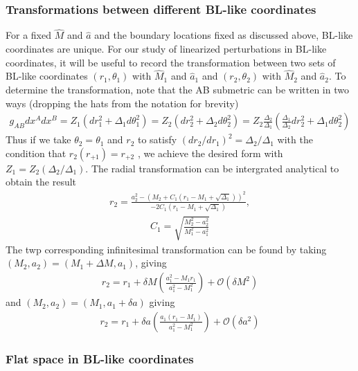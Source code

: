 \documentclass[aps,prd,amsmath,showpacs,amssymb,superscriptaddress,nofootinbib,longbibliography,eqsecnum,preprintnumbers]{revtex4-1}
\begin{document}
\subsubsection{Transformations between different BL-like coordinates}
For a fixed $\hat M$ and $\hat a$ and the boundary locations fixed as discussed above, BL-like coordinates are unique. For our study of linearized perturbations in BL-like coordinates, it will be useful to record the transformation between two sets of BL-like coordinates $(r_1,\theta_1)$  with $\hat M_1$ and $\hat a_1$ and $(r_2,\theta_2)$ with $\hat M_2$ and $\hat a_2$. To determine the transformation, note that the AB submetric can be written in two ways (dropping the hats from the notation for brevity)
\begin{align}
g_{AB}dx^Adx^B=Z_1(dr_1^2+\Delta_1 d\theta_1^2)=Z_2(dr_2^2+\Delta_2 d\theta_2^2)=Z_2\frac{\Delta_2}{\Delta_1}\left(\frac{\Delta_1}{\Delta_2}dr_2^2+\Delta_1 d\theta_2^2\right)
\end{align}
Thus if we take $\theta_2 =\theta_1$ and $r_2$ to satisfy $(dr_2/dr_1)^2=\Delta_2/\Delta_1$ 
with the condition that $r_2(r_{+1})=r_{+2}$
, we achieve the desired form with $Z_1=Z_2(\Delta_2/\Delta_1)$. The radial transformation can be intergrated analytical to obtain the result
\begin{align}
r_2=\frac{a_2^2-(M_2+C_1(r_1-M_1+\sqrt{\Delta_1}))^2}{-2C_1(r_1-M_1+\sqrt{\Delta_1})},
\end{align}
\begin{align}
C_1=\sqrt{\frac{M_2^2-a_2^2}{M_1^2-a_1^2}}
\end{align}
The twp corresponding infinitesimal transformation can be found by taking $(M_2,a_2) =(M_1+\Delta M, a_1)$, giving
\begin{align}
r_2=r_1+\delta M\left(\frac{a_1^2-M_1r_1}{a_1^2-M_1^2}\right) +\mathcal{O}(\delta M^2) \label{eq:infM}
\end{align}
 and $(M_2,a_2)=(M_1,a_1 +\delta a)$ giving
 \begin{align}
 r_2=r_1+\delta a\left(\frac{a_1(r_1-M_1)}{a_1^2-M_1^2}\right) +\mathcal{O}(\delta a^2)  \label{eq:infa}
 \end{align}

\subsubsection{Flat space in BL-like coordinates}
\end{document}

